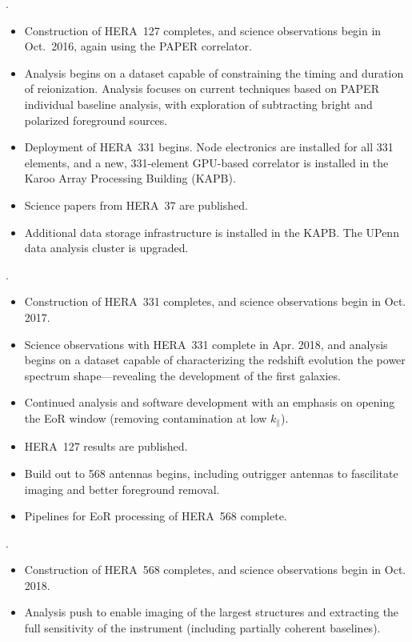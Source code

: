 \documentclass[preprint]{aastex}
\begin{document}
.
\begin{itemize}\setlength{\parskip}{0pt}\itemsep0pt
\vspace{-7pt}
  \item Construction of HERA~127 completes, and science observations begin in Oct.\ 2016, again using the PAPER correlator.
  \item Analysis begins on a dataset capable of constraining the timing and duration of reionization. Analysis focuses on current techniques based on PAPER individual baseline analysis, with exploration of subtracting bright and polarized foreground sources.
  \item Deployment of HERA~331 begins. Node electronics are installed for all 331 elements, and a new, 331-element GPU-based correlator is installed in the Karoo Array Processing Building (KAPB).
  \item Science papers from HERA~37 are published.
  \item  Additional data storage infrastructure is installed in the
KAPB.  The UPenn data analysis cluster is upgraded. 
\end{itemize}

.
\begin{itemize}\setlength{\parskip}{0pt}\itemsep0pt
\vspace{-7pt}
  \item Construction of HERA~331 completes, and science observations begin in Oct. 2017.
  \item Science observations with HERA~331 complete in Apr. 2018, and analysis begins on a dataset capable of
characterizing the redshift evolution the power spectrum shape---revealing the development of the first galaxies.
  \item Continued analysis and software development with an emphasis on opening the EoR window (removing contamination at low $k_{\parallel}$). 
  \item  HERA~127 results are published.
  \item Build out to 568 antennas begins, including outrigger antennas to fascilitate imaging and better foreground removal.
  \item Pipelines for EoR processing of HERA~568 complete.
\end{itemize}

.
\begin{itemize}\setlength{\parskip}{0pt}\itemsep0pt
\vspace{-7pt}
  \item Construction of HERA~568 completes, and science observations begin in Oct. 2018.
  \item Analysis push to enable imaging of the largest structures and extracting the full sensitivity of the instrument (including partially coherent baselines). 
\end{itemize}
\end{document}
